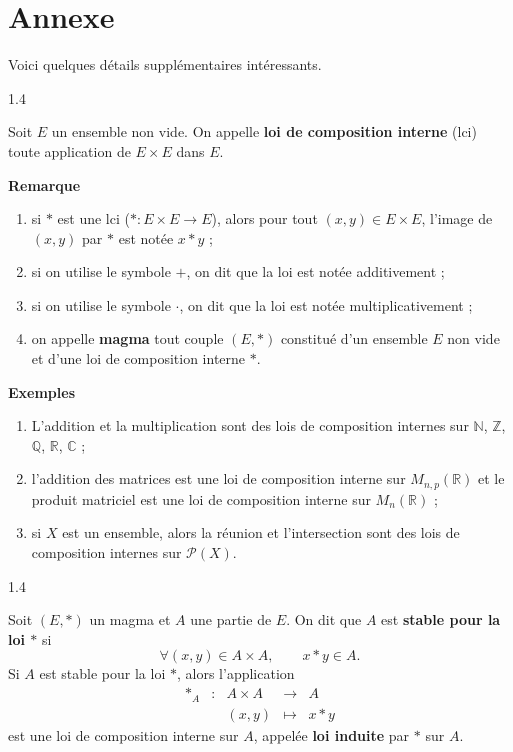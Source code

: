 \documentclass{article}
\begin{document}
\newpage
\section{Annexe}
Voici quelques détails supplémentaires intéressants.

\begin{spacing}{1.4}
\begin{tcolorbox}[colframe=blue!75!black,colback=blue!5!white,title=Définition - Loi de composition interne]
Soit $E$ un ensemble non vide. On appelle \textbf{loi de composition interne} (lci) toute application de $E\times E$ dans $E$.
\end{tcolorbox}
\end{spacing}

\textbf{Remarque}
\begin{enumerate}
\item si $*$ est une lci ($*:E\times E\to E$), alors pour tout $(x,y)\in E\times E$, l'image de $(x,y)$ par $*$ est notée $x*y$ ;
\item si on utilise le symbole $+$, on dit que la loi est notée additivement ;
\item si on utilise le symbole $\cdot$, on dit que la loi est notée multiplicativement ;
\item on appelle \textbf{magma} tout couple $(E,*)$ constitué d'un ensemble $E$ non vide et d'une loi de composition interne $*$.
\end{enumerate}

\textbf{Exemples}
\begin{enumerate}
\item L'addition et la multiplication sont des lois de composition internes sur $\mathbb{N}$, $\mathbb{Z}$, $\mathbb{Q}$, $\mathbb{R}$, $\mathbb{C}$ ;
\item l'addition des matrices est une loi de composition interne sur $M_{n,p}(\mathbb{R})$ et le produit matriciel est une loi de composition interne sur $M_n(\mathbb{R})$ ;
\item si $X$ est un ensemble, alors la réunion et l'intersection sont des lois de composition internes sur $\mathcal{P}(X)$.
\end{enumerate}

\begin{spacing}{1.4}
\begin{tcolorbox}[colframe=blue!75!black,colback=blue!5!white,title=Loi stable et loi induite]
Soit $(E,*)$ un magma et $A$ une partie de $E$. On dit que $A$ est \textbf{stable pour la loi $*$} si
\[
\forall (x,y)\in A\times A,\qquad x*y\in A.
\]
Si $A$ est stable pour la loi $*$, alors l'application
\[
\begin{array}{ccccc}
*_A & : & A\times A & \to & A\\
& & (x,y) & \mapsto & x*y
\end{array}
\]
est une loi de composition interne sur $A$, appelée \textbf{loi induite} par $*$ sur $A$.
\end{tcolorbox}
\end{spacing}
\end{document}
